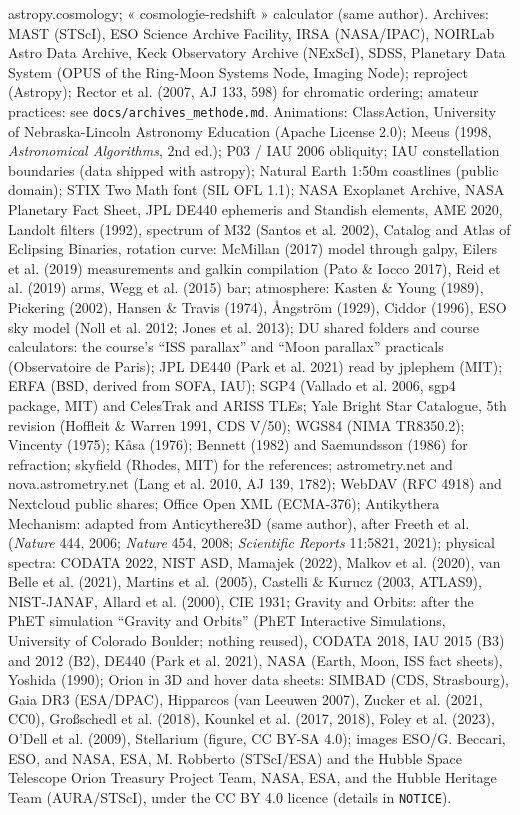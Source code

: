 astropy.cosmology; « cosmologie-redshift » calculator (same author). Archives: MAST (STScI), ESO Science Archive Facility, IRSA (NASA/IPAC), NOIRLab Astro Data Archive, Keck Observatory Archive (NExScI), SDSS, Planetary Data System (OPUS of the Ring-Moon Systems Node, Imaging Node); reproject (Astropy); Rector et al. (2007, AJ 133, 598) for chromatic ordering; amateur practices: see \texttt{docs/archives\_methode.md}. Animations: ClassAction, University of Nebraska-Lincoln Astronomy Education (Apache License 2.0); Meeus (1998, \emph{Astronomical Algorithms}, 2nd ed.); P03 / IAU 2006 obliquity; IAU constellation boundaries (data shipped with astropy); Natural Earth 1:50m coastlines (public domain); STIX Two Math font (SIL OFL 1.1); NASA Exoplanet Archive, NASA Planetary Fact Sheet, JPL DE440 ephemeris and Standish elements, AME 2020, Landolt filters (1992), spectrum of M32 (Santos et al. 2002), Catalog and Atlas of Eclipsing Binaries, rotation curve: McMillan (2017) model through galpy, Eilers et al. (2019) measurements and galkin compilation (Pato \& Iocco 2017), Reid et al. (2019) arms, Wegg et al. (2015) bar; atmosphere: Kasten \& Young (1989), Pickering (2002), Hansen \& Travis (1974), Ångström (1929), Ciddor (1996), ESO sky model (Noll et al. 2012; Jones et al. 2013); DU shared folders and course calculators: the course's “ISS parallax” and “Moon parallax” practicals (Observatoire de Paris); JPL DE440 (Park et al. 2021) read by jplephem (MIT); ERFA (BSD, derived from SOFA, IAU); SGP4 (Vallado et al. 2006, sgp4 package, MIT) and CelesTrak and ARISS TLEs; Yale Bright Star Catalogue, 5th revision (Hoffleit \& Warren 1991, CDS V/50); WGS84 (NIMA TR8350.2); Vincenty (1975); Kåsa (1976); Bennett (1982) and Saemundsson (1986) for refraction; skyfield (Rhodes, MIT) for the references; astrometry.net and nova.astrometry.net (Lang et al. 2010, AJ 139, 1782); WebDAV (RFC 4918) and Nextcloud public shares; Office Open XML (ECMA-376); Antikythera Mechanism: adapted from Anticythere3D (same author), after Freeth et al. (\emph{Nature} 444, 2006; \emph{Nature} 454, 2008; \emph{Scientific Reports} 11:5821, 2021); physical spectra: CODATA 2022, NIST ASD, Mamajek (2022), Malkov et al. (2020), van Belle et al. (2021), Martins et al. (2005), Castelli \& Kurucz (2003, ATLAS9), NIST-JANAF, Allard et al. (2000), CIE 1931; Gravity and Orbits: after the PhET simulation “Gravity and Orbits” (PhET Interactive Simulations, University of Colorado Boulder; nothing reused), CODATA 2018, IAU 2015 (B3) and 2012 (B2), DE440 (Park et al. 2021), NASA (Earth, Moon, ISS fact sheets), Yoshida (1990); Orion in 3D and hover data sheets: SIMBAD (CDS, Strasbourg), Gaia DR3 (ESA/DPAC), Hipparcos (van Leeuwen 2007), Zucker et al. (2021, CC0), Großschedl et al. (2018), Kounkel et al. (2017, 2018), Foley et al. (2023), O'Dell et al. (2009), Stellarium (figure, CC BY-SA 4.0); images ESO/G. Beccari, ESO, and NASA, ESA, M. Robberto (STScI/ESA) and the Hubble Space Telescope Orion Treasury Project Team, NASA, ESA, and the Hubble Heritage Team (AURA/STScI), under the CC BY 4.0 licence (details in \texttt{NOTICE}).


